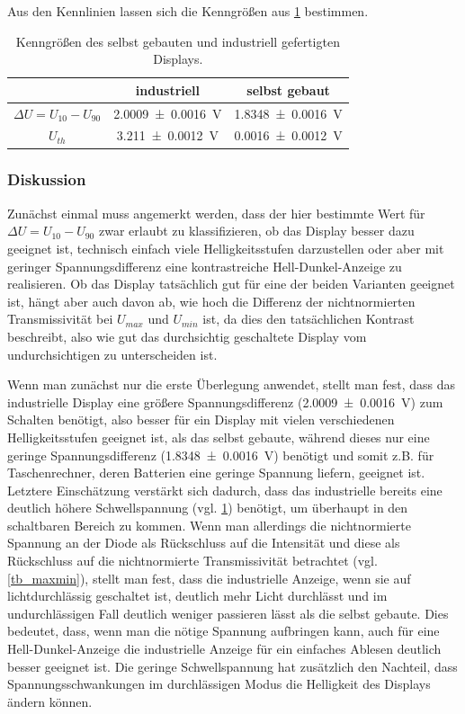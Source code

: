 \documentclass[
	a4paper,
	12pt,
	pagesize,
	ngerman
]{scrartcl}
\begin{document}
	Aus den Kennlinien lassen sich die Kenngrößen aus \cref{tb_kenngroessen} bestimmen.
	\begin{table}[H]
		\centering
		\begin{tabular}{ c | c | c }
			 & industriell & selbst gebaut \\ \hline
			$\Delta U=U_{10}-U_{90}$&\SI{2.0009+-0.0016}{V}&\SI{1.8348+-0.0016}{V} \\
			$U_{th}$ & \SI{3.211+-0.0012}{V} & \SI{0.0016+-0.0012}{V} \\
			\hline
		\end{tabular}
		\caption{Kenngrößen des selbst gebauten und industriell gefertigten Displays.}
		\label{tb_kenngroessen}
	\end{table}

	\subsubsection{Diskussion}
	Zunächst einmal muss angemerkt werden, dass der hier bestimmte Wert für $\Delta U=U_{10}-U_{90}$ zwar erlaubt zu klassifizieren, ob das Display besser dazu geeignet ist, technisch einfach viele Helligkeitsstufen darzustellen oder aber mit geringer Spannungsdifferenz eine kontrastreiche Hell-Dunkel-Anzeige zu realisieren.
	Ob das Display tatsächlich gut für eine der beiden Varianten geeignet ist, hängt aber auch davon ab, wie hoch die Differenz der nichtnormierten Transmissivität bei $U_{max}$ und $U_{min}$ ist, da dies den tatsächlichen Kontrast beschreibt, also wie gut das durchsichtig geschaltete Display vom undurchsichtigen zu unterscheiden ist.

	Wenn man zunächst nur die erste Überlegung anwendet, stellt man fest, dass das industrielle Display eine größere Spannungsdifferenz (\SI{2.0009+-0.0016}{V}) zum Schalten benötigt, also besser für ein Display mit vielen verschiedenen Helligkeitsstufen geeignet ist, als das selbst gebaute, während dieses nur eine geringe Spannungsdifferenz (\SI{1.8348+-0.0016}{V}) benötigt und somit z.B. für Taschenrechner, deren Batterien eine geringe Spannung liefern, geeignet ist.
	Letztere Einschätzung verstärkt sich dadurch, dass das industrielle bereits eine deutlich höhere Schwellspannung (vgl. \cref{tb_kenngroessen}) benötigt, um überhaupt in den schaltbaren Bereich zu kommen.
	Wenn man allerdings die nichtnormierte Spannung an der Diode als Rückschluss auf die Intensität und diese als Rückschluss auf die nichtnormierte Transmissivität betrachtet (vgl. \cref{tb_maxmin}), stellt man fest, dass die industrielle Anzeige, wenn sie auf lichtdurchlässig geschaltet ist, deutlich mehr Licht durchlässt und im undurchlässigen Fall deutlich weniger passieren lässt als die selbst gebaute.
	Dies bedeutet, dass, wenn man die nötige Spannung aufbringen kann, auch für eine Hell-Dunkel-Anzeige die industrielle Anzeige für ein einfaches Ablesen deutlich besser geeignet ist.
	Die geringe Schwellspannung hat zusätzlich den Nachteil, dass  Spannungsschwankungen im durchlässigen Modus die Helligkeit des Displays ändern können.
\end{document}
